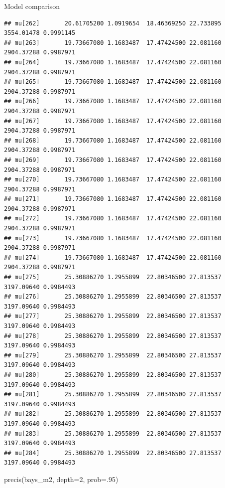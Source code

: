 \documentclass[
  ignorenonframetext,
]{beamer}
\newenvironment{Shaded}{\begin{snugshade}}{\end{snugshade}}
\newcommand{\AttributeTok}[1]{\textcolor[rgb]{0.77,0.63,0.00}{#1}}
\newcommand{\DecValTok}[1]{\textcolor[rgb]{0.00,0.00,0.81}{#1}}
\newcommand{\FunctionTok}[1]{\textcolor[rgb]{0.00,0.00,0.00}{#1}}
\newcommand{\NormalTok}[1]{#1}
\begin{document}
\begin{frame}[fragile]{Model comparison}
\begin{verbatim}
## mu[262]       20.61705200 1.0919654  18.46369250 22.733895 3554.01478 0.9991145
## mu[263]       19.73667080 1.1683487  17.47424500 22.081160 2904.37288 0.9987971
## mu[264]       19.73667080 1.1683487  17.47424500 22.081160 2904.37288 0.9987971
## mu[265]       19.73667080 1.1683487  17.47424500 22.081160 2904.37288 0.9987971
## mu[266]       19.73667080 1.1683487  17.47424500 22.081160 2904.37288 0.9987971
## mu[267]       19.73667080 1.1683487  17.47424500 22.081160 2904.37288 0.9987971
## mu[268]       19.73667080 1.1683487  17.47424500 22.081160 2904.37288 0.9987971
## mu[269]       19.73667080 1.1683487  17.47424500 22.081160 2904.37288 0.9987971
## mu[270]       19.73667080 1.1683487  17.47424500 22.081160 2904.37288 0.9987971
## mu[271]       19.73667080 1.1683487  17.47424500 22.081160 2904.37288 0.9987971
## mu[272]       19.73667080 1.1683487  17.47424500 22.081160 2904.37288 0.9987971
## mu[273]       19.73667080 1.1683487  17.47424500 22.081160 2904.37288 0.9987971
## mu[274]       19.73667080 1.1683487  17.47424500 22.081160 2904.37288 0.9987971
## mu[275]       25.30886270 1.2955899  22.80346500 27.813537 3197.09640 0.9984493
## mu[276]       25.30886270 1.2955899  22.80346500 27.813537 3197.09640 0.9984493
## mu[277]       25.30886270 1.2955899  22.80346500 27.813537 3197.09640 0.9984493
## mu[278]       25.30886270 1.2955899  22.80346500 27.813537 3197.09640 0.9984493
## mu[279]       25.30886270 1.2955899  22.80346500 27.813537 3197.09640 0.9984493
## mu[280]       25.30886270 1.2955899  22.80346500 27.813537 3197.09640 0.9984493
## mu[281]       25.30886270 1.2955899  22.80346500 27.813537 3197.09640 0.9984493
## mu[282]       25.30886270 1.2955899  22.80346500 27.813537 3197.09640 0.9984493
## mu[283]       25.30886270 1.2955899  22.80346500 27.813537 3197.09640 0.9984493
## mu[284]       25.30886270 1.2955899  22.80346500 27.813537 3197.09640 0.9984493
\end{verbatim}

\begin{Shaded}
\begin{Highlighting}[]
\FunctionTok{precis}\NormalTok{(bays\_m2, }\AttributeTok{depth=}\DecValTok{2}\NormalTok{, }\AttributeTok{prob=}\NormalTok{.}\DecValTok{95}\NormalTok{)}
\end{Highlighting}
\end{Shaded}


\end{frame}
\end{document}
